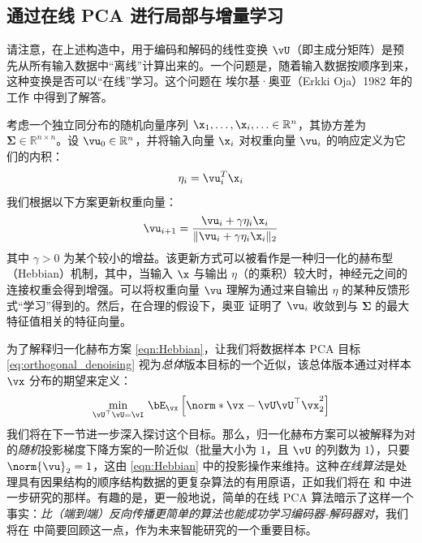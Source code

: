 \documentclass[../../book-main_zh.tex]{subfiles}
\begin{document}
\subsection{通过在线 PCA 进行局部与增量学习}
请注意，在上述构造中，用于编码和解码的线性变换
$\vU$（即主成分矩阵）是预先从所有输入数据中“离线”计算出来的。一个问题是，随着输入数据按顺序到来，这种变换是否可以“在线”学习。这个问题在
埃尔基·奥亚（Erkki Oja）1982 年的工作 \cite{Oja1982SimplifiedNM} 中得到了解答。
\begin{example} 考虑一个独立同分布的随机向量序列 $\x_1, \ldots, \x_i, \ldots \in
    \mathbb{R}^n$，其协方差为 $\boldsymbol{\Sigma} \in
    \mathbb{R}^{n\times n}$。设 $\vu_0 \in \mathbb{R}^n$，并将输入向量 $\x_i$
    对权重向量 $\vu_i$ 的响应定义为它们的内积：
    \begin{equation}
        \eta_i = \vu_i^T \x_i
    \end{equation}
    我们根据以下方案更新权重向量：
    \begin{equation}
        \vu_{i+1} = \frac{\vu_i + \gamma \eta_i \x_i}{\|\vu_i + \gamma
        \eta_i \x_i\|_2}
        \label{eqn:Hebbian}
    \end{equation}
    其中 $\gamma >0$ 为某个较小的增益。该更新方式可以被看作是一种归一化的赫布型（Hebbian）机制，其中，当输入 $\x$ 与输出 $\eta$（的乘积）较大时，神经元之间的连接权重会得到增强。可以将权重向量 $\vu$ 理解为通过来自输出 $\eta$ 的某种反馈形式“学习”得到的。然后，在合理的假设下，奥亚 \cite{Oja1982SimplifiedNM}
    证明了 $\vu_i$ 收敛到与 $\boldsymbol{\Sigma}$ 的最大特征值相关的特征向量。
\end{example}

为了解释归一化赫布方案 \eqref{eqn:Hebbian}，让我们将数据样本 PCA 目标
\eqref{eq:orthogonal_denoising} 视为\textit{总体}版本目标的一个近似，该总体版本通过对样本
$\vx$ 分布的期望来定义：
\begin{equation}\label{eq:pca-reconstruction-expectation}
    \min_{\vU^\top \vU = \vI}\, \bE_{\vx}\left[\norm*{\vx
    - \vU\vU^\top \vx}_2^2\right]
\end{equation}
我们将在下一节进一步深入探讨这个目标。那么，归一化赫布方案可以被解释为对
的\textit{随机}投影梯度下降方案的一阶近似（批量大小为 $1$，且 $\vU$ 的列数为 $1$），只要
$\norm{\vu}_2 = 1$，这由 \eqref{eqn:Hebbian}
中的投影操作来维持。这种\textit{在线算法}是处理具有因果结构的顺序结构数据的更复杂算法的有用原语，正如我们将在
 和 
中进一步研究的那样。有趣的是，更一般地说，简单的在线 PCA
算法暗示了这样一个事实：\textit{比（端到端）反向传播更简单的算法也能成功学习编码器-解码器对}，我们将在
 中简要回顾这一点，作为未来智能研究的一个重要目标。
\end{document}
